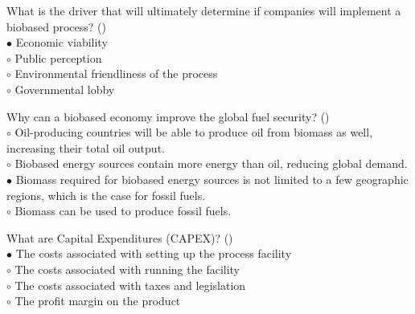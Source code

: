 \documentclass[]{beamer}
\begin{document}
\begin{CJK}{UTF8}{gbsn}
\begin{frame}[shrink] {} 
\addtocounter{answers}{1}
\color{blue}
  What is the driver that will ultimately determine if companies will implement a biobased process?
 ({})\\
\color{black}
\setlength{\parindent}{-0.4cm}
{\color{red}$\bullet$} Economic viability   \\
{\color{red}$\circ$} Public perception  \\
{\color{red}$\circ$} Environmental friendliness of the process   \\
{\color{red}$\circ$} Governmental lobby  \\
\end{frame}


\begin{frame}[shrink] {} 
\addtocounter{answers}{1}
\color{blue}
  Why can a biobased economy improve the global fuel security?
 ({})\\
\color{black}
\setlength{\parindent}{-0.4cm}
{\color{red}$\circ$} Oil-producing countries will be able to produce oil from biomass as well, increasing their total oil output.  \\
{\color{red}$\circ$} Biobased energy sources contain more energy than oil, reducing global demand.  \\
{\color{red}$\bullet$} Biomass required for biobased energy sources is not limited to a few geographic regions, which is the case for fossil fuels.  \\
{\color{red}$\circ$} Biomass can be used to produce fossil fuels.   \\
\end{frame}


\begin{frame}[shrink] {} 
\addtocounter{answers}{1}
\color{blue}
  What are Capital Expenditures (CAPEX)?
 ({})\\
\color{black}
\setlength{\parindent}{-0.4cm}
{\color{red}$\bullet$} The costs associated with setting up the process facility  \\
{\color{red}$\circ$} The costs associated with running the facility  \\
{\color{red}$\circ$} The costs associated with taxes and legislation  \\
{\color{red}$\circ$} The profit margin on the product  \\
\end{frame}



\end{CJK}
\end{document}
